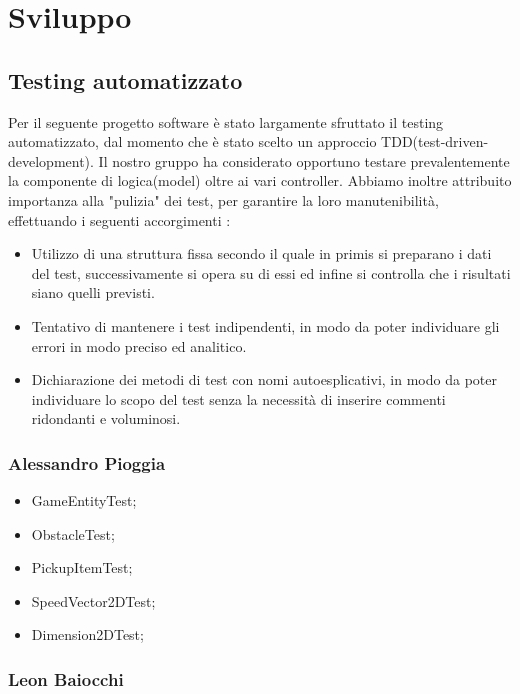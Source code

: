 
\chapter{Sviluppo}
\section{Testing automatizzato}

Per il seguente progetto software è stato largamente sfruttato il testing automatizzato, dal momento che è stato scelto un approccio TDD(test-driven-development). Il nostro gruppo ha considerato opportuno testare prevalentemente la componente di logica(model) oltre ai vari controller.
Abbiamo inoltre attribuito importanza alla "pulizia" dei test, per garantire la loro manutenibilità, effettuando i seguenti accorgimenti : 

\begin{itemize}
	\item Utilizzo di una struttura fissa secondo il quale in primis si preparano i dati del test, successivamente si opera su di essi ed infine si controlla che i risultati siano quelli previsti. 
	\item Tentativo di mantenere i test indipendenti, in modo da poter individuare gli errori in modo preciso ed analitico.
	\item Dichiarazione dei metodi di test con nomi autoesplicativi, in modo da poter individuare lo scopo del test senza la necessità di inserire commenti ridondanti e voluminosi.
\end{itemize}

\subsection*{Alessandro Pioggia}

\begin{itemize}
	\item GameEntityTest;
	\item ObstacleTest;
	\item PickupItemTest;
	\item SpeedVector2DTest;
	\item Dimension2DTest;
\end{itemize}

\subsection*{Leon Baiocchi}

